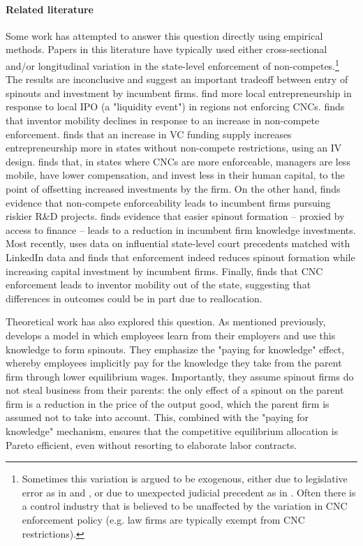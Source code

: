 \documentclass[12pt,english]{article}
\theoremstyle{remark}
\begin{document}
\paragraph{Related literature}

Some work has attempted to answer this question directly using empirical methods. Papers in this literature have typically used either cross-sectional and/or longitudinal variation in the state-level enforcement of non-competes.\footnote{Sometimes this variation is argued to be exogenous, either due to legislative error as in \cite{marx_mobility_2009} and \cite{marx_regional_2015}, or due to unexpected judicial precedent as in \cite{jeffers_impact_2018}. Often there is a control industry that is believed to be unaffected by the variation in CNC enforcement policy (e.g. law firms are typically exempt from CNC restrictions).} The results are inconclusive and suggest an important tradeoff between entry of spinouts and investment by incumbent firms. \cite{stuart_liquidity_2003} find more local  entrepreneurship in response to local IPO (a "liquidity event") in regions not enforcing CNCs. \cite{marx_mobility_2009} finds that inventor mobility declines in response to an increase in non-compete enforcement. \cite{samila_venture_2010} finds that an increase in VC funding supply increases entrepreneurship more in states without non-compete restrictions, using an IV design. \cite{garmaise_ties_2011} finds that, in states where CNCs are more enforceable, managers are less mobile, have lower compensation, and invest less in their human capital, to the point of offsetting increased investments by the firm. On the other hand, \cite{conti_non-competition_2014} finds evidence that non-compete enforceability leads to incumbent firms pursuing riskier R\&D projects. \cite{colombo_does_2013} finds evidence that easier spinout formation -- proxied by access to finance -- leads to a reduction in incumbent firm knowledge investments.  Most recently, \cite{jeffers_impact_2018} uses data on influential state-level court precedents matched with LinkedIn data and finds that enforcement indeed reduces spinout formation while increasing capital investment by incumbent firms. Finally, \cite{marx_regional_2015} finds that CNC enforcement leads to inventor mobility out of the state, suggesting that differences in outcomes could be in part due to reallocation. 

Theoretical work has also explored this question. As mentioned previously, \cite{franco_spin-outs:_2006} develops a model in which employees learn from their employers and use this knowledge to form spinouts. They emphasize the "paying for knowledge" effect, whereby employees implicitly pay for the knowledge they take from the parent firm through lower equilibrium wages. Importantly, they assume spinout firms do not steal business from their parents: the only effect of a spinout on the parent firm is a reduction in the price of the output good, which the parent firm is assumed not to take into account. This, combined with the "paying for knowledge" mechanism, ensures that the competitive equilibrium allocation is Pareto efficient, even without resorting to elaborate labor contracts.
\end{document}
